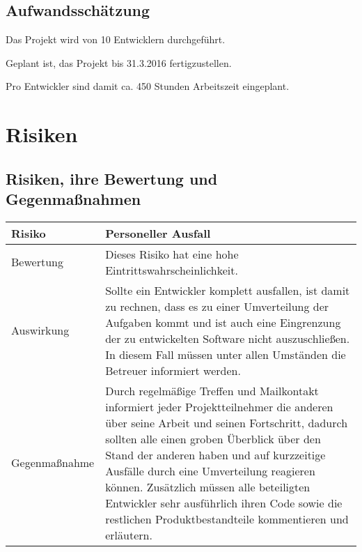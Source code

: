 \subsection{Aufwandsschätzung}
Das Projekt wird von 10 Entwicklern durchgeführt.

Geplant ist, das Projekt bis 31.3.2016 fertigzustellen.

Pro Entwickler sind damit ca. 450 Stunden Arbeitszeit eingeplant.

\section{Risiken}

\subsection{Risiken, ihre Bewertung und Gegenmaßnahmen}
\begin{center}
	\begin{tabular}{| p{3cm} | p{12cm} |}
		\hline
		Risiko & Personeller Ausfall \\ \hline
		
		Bewertung & Dieses Risiko hat eine hohe Eintrittswahrscheinlichkeit. \\ \hline
		
		Auswirkung & Sollte ein Entwickler komplett ausfallen, ist damit zu rechnen, dass es zu einer Umverteilung der Aufgaben kommt und \ggf ist auch eine Eingrenzung der zu entwickelten Software nicht auszuschließen.
		In diesem Fall müssen unter allen Umständen die Betreuer informiert werden. \\ \hline
		
		Gegenmaßnahme & Durch regelmäßige Treffen und Mailkontakt informiert jeder Projektteilnehmer die anderen über seine Arbeit und seinen Fortschritt, dadurch sollten alle einen groben Überblick über den Stand der anderen haben und auf kurzzeitige Ausfälle durch eine Umverteilung reagieren können.
		Zusätzlich müssen alle beteiligten Entwickler sehr ausführlich ihren Code sowie die restlichen Produktbestandteile kommentieren und erläutern. \\
		\hline
	\end{tabular}
\end{center}

